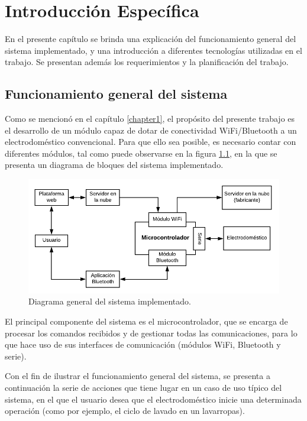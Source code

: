\chapter{Introducción Específica}
\label{Chapter2}

En el presente capítulo se brinda una explicación del funcionamiento general del sistema implementado, y una introducción a diferentes tecnologías utilizadas en el trabajo. Se presentan además los requerimientos y la planificación del trabajo.

\section{Funcionamiento general del sistema}
\label{funcionamiento_general}

Como se mencionó en el capítulo \ref{chapter1}, el propósito del presente trabajo es el desarrollo de un módulo capaz de dotar de conectividad WiFi/Bluetooth a un electrodoméstico convencional. Para que ello sea posible, es necesario contar con diferentes módulos, tal como puede observarse en la figura \ref{fig:simplified_diagram}, en la que se presenta un diagrama de bloques del sistema implementado. 

\begin{figure}[h]
\centering
\includegraphics[width=\textwidth]{./Figures/simplified_diagram.pdf}
\caption{Diagrama general del sistema implementado.}
\label{fig:simplified_diagram}
\end{figure}

El principal componente del sistema es el microcontrolador, que se encarga de procesar los comandos recibidos y de gestionar todas las comunicaciones, para lo que hace uso de sus interfaces de comunicación (módulos WiFi, Bluetooth y serie).

Con el fin de ilustrar el funcionamiento general del sistema, se presenta a continuación la serie de acciones que tiene lugar en un caso de uso típico del sistema, en el que el usuario desea que el electrodoméstico inicie una determinada operación (como por ejemplo, el ciclo de lavado en un lavarropas).

